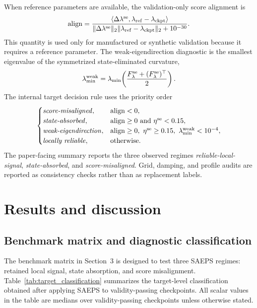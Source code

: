 \documentclass[preprint,12pt]{elsarticle}
\newcommand{\classlabel}[1]{\textnormal{\emph{#1}}}
\begin{document}
When reference parameters are available, the validation-only score alignment is
\begin{equation}
    \mathrm{align}
    =
    \frac{
    \langle \Delta\lambda^{\rm se},\lambda_{\rm ref}-\lambda_{\rm ckpt}\rangle
    }{
    \|\Delta\lambda^{\rm se}\|_2\|\lambda_{\rm ref}-\lambda_{\rm ckpt}\|_2+10^{-30}
    }.
    \label{eq:score_alignment}
\end{equation}
This quantity is used only for manufactured or synthetic validation because it requires a reference parameter.  The weak-eigendirection diagnostic is the smallest eigenvalue of the symmetrized state-eliminated curvature,
\begin{equation}
    \lambda_{\min}^{\rm weak}
    =
    \lambda_{\min}\!\left(\frac{F_\lambda^{\rm se}+(F_\lambda^{\rm se})^\top}{2}\right).
\end{equation}
The internal target decision rule uses the priority order
\begin{equation}
\begin{cases}
\classlabel{score-misaligned}, & \mathrm{align}<0,\\
\classlabel{state-absorbed}, & \mathrm{align}\ge0\ \text{and}\ \eta^{\rm se}<0.15,\\
\classlabel{weak-eigendirection}, & \mathrm{align}\ge0,\ \eta^{\rm se}\ge0.15,\ \lambda_{\min}^{\rm weak}<10^{-4},\\
\classlabel{locally reliable}, & \mathrm{otherwise}.
\end{cases}
\label{eq:target_rule}
\end{equation}
The paper-facing summary reports the three observed regimes \classlabel{reliable-local-signal}, \classlabel{state-absorbed}, and \classlabel{score-misaligned}.  Grid, damping, and profile audits are reported as consistency checks rather than as replacement labels.

\section{Results and discussion}

\subsection{Benchmark matrix and diagnostic classification}

The benchmark matrix in Section~3 is designed to test three SAEPS regimes: retained local signal, state absorption, and score misalignment. Table~\ref{tab:target_classification} summarizes the target-level classification obtained after applying SAEPS to validity-passing checkpoints. All scalar values in the table are medians over validity-passing checkpoints unless otherwise stated.
\end{document}
